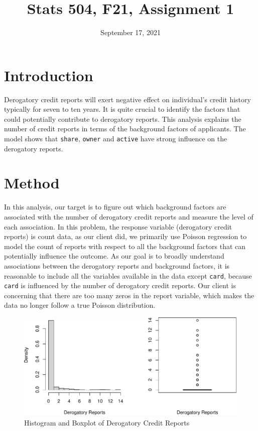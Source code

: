 \documentclass[
]{article}
\title{Stats 504, F21, Assignment 1}
\author{}
\date{\vspace{-2.5em}September 17, 2021}
\begin{document}
\maketitle

\hypertarget{introduction}{%
\section{Introduction}\label{introduction}}

Derogatory credit reports will exert negative effect on individual's
credit history typically for seven to ten years. It is quite crucial to
identify the factors that could potentially contribute to derogatory
reports. This analysis explains the number of credit reports in terms of
the background factors of applicants. The model shows that
\texttt{share}, \texttt{owner} and \texttt{active} have strong influence
on the derogatory reports.

\hypertarget{method}{%
\section{Method}\label{method}}

In this analysis, our target is to figure out which background factors
are associated with the number of derogatory credit reports and measure
the level of each association. In this problem, the response variable
(derogatory credit reports) is count data, as our client did, we
primarily use Poisson regression to model the count of reports with
respect to all the background factors that can potentially influence the
outcome. As our goal is to broadly understand associations between the
derogatory reports and background factors, it is reasonable to include
all the variables available in the data except \texttt{card}, because
\texttt{card} is influenced by the number of derogatory credit reports.
Our client is concerning that there are too many zeros in the report
variable, which makes the data no longer follow a true Poisson
distribution.

\begin{figure}

{\centering \includegraphics{stats504_hw1_files/figure-latex/unnamed-chunk-1-1} 

}

\caption{Histogram and Boxplot of Derogatory Credit Reports}\label{fig:unnamed-chunk-1}
\end{figure}
\end{document}
